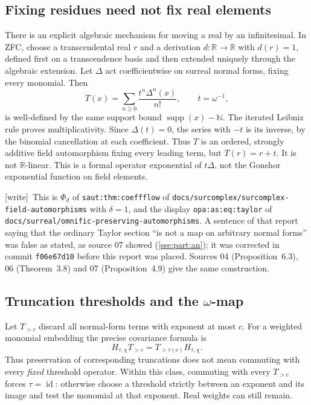 \documentclass[11pt,a4paper]{article}
\numberwithin{equation}{section}
\theoremstyle{plain}
\theoremstyle{definition}
\theoremstyle{remark}
\newcommand{\R}{\mathbb{R}}
\newcommand{\N}{\mathbb{N}}
\newcommand{\id}{\operatorname{id}}
\newcommand{\supp}{\operatorname{supp}}
\newcommand{\code}[1]{\texttt{\small #1}}
\newcommand{\lbl}[1]{\nolinkurl{#1}}%
\newcommand{\fn}[1]{\nolinkurl{#1}}%
\newcommand{\wtag}{\textup{\textsf{[write]}}}%
\newenvironment{wnote}{\par\smallskip\noindent\wtag\ }{\par\smallskip}
\begin{document}
\subsection{Fixing residues need not fix real elements}
There is an explicit algebraic mechanism for moving a real by an
infinitesimal. In ZFC, choose a transcendental real $r$ and a derivation
$d:\R\to\R$ with $d(r)=1$, defined first on a transcendence basis and then
extended uniquely through the algebraic extension. Let $\Delta$ act
coefficientwise on surreal normal forms, fixing every monomial. Then
\begin{equation}\label{sse:eq:taylorshift}
 T(x)=\sum_{n\ge0}\frac{t^n\Delta^n(x)}{n!},\qquad t=\omega^{-1},
\end{equation}
is well-defined by the same support bound $\supp(x)-\N$.
The iterated Leibniz rule proves multiplicativity. Since $\Delta(t)=0$,
the series with $-t$ is its inverse, by the binomial cancellation at each
coefficient. Thus $T$ is an ordered, strongly additive field automorphism
fixing every leading term, but $T(r)=r+t$. It is not $\R$-linear. This is
a formal operator exponential of $t\Delta$, not the Gonshor exponential
function on field elements.
\begin{wnote}This is $\Phi_d$ of \lbl{saut:thm:coeffflow} of \fn{docs/surcomplex/surcomplex-field-automorphisms} with $\delta=1$, and the display \lbl{opa:as:eq:taylor} of \fn{docs/surreal/omnific-preserving-automorphisms}. A sentence of that report saying that the ordinary Taylor section ``is not a map on arbitrary normal forms'' was false as stated, as source 07 showed (\cref{sse:part:an}); it was corrected in commit \code{f06e67d10} before this report was placed. Sources 04 (Proposition~6.3), 06 (Theorem~3.8) and 07 (Proposition~4.9) give the same construction.\end{wnote}

\subsection{Truncation thresholds and the \texorpdfstring{$\omega$}{omega}-map}
Let $T_{>c}$ discard all normal-form terms with exponent at most $c$.
For a weighted monomial embedding the precise covariance formula is
\begin{equation}\label{sse:eq:truncation}
 H_{\tau,\chi}T_{>c}=T_{>\tau(c)}H_{\tau,\chi}.
\end{equation}
Thus preservation of corresponding truncations does not mean commuting
with every \emph{fixed} threshold operator. Within this class, commuting
with every $T_{>c}$ forces $\tau=\id$: otherwise choose a threshold strictly
between an exponent and its image and test the monomial at that exponent.
Real weights can still remain.
\end{document}
